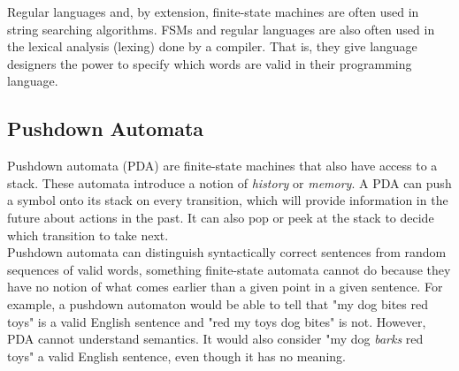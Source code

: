 \vspace{3mm}
\begin{center}
\end{center}
\vspace{5mm}

Regular languages and, by extension, finite-state machines are often used in string searching algorithms. FSMs and regular languages are also often used in the lexical analysis (lexing) done by a compiler. That is, they give language designers the power to specify which words are valid in their programming language. \\

\subsection{Pushdown Automata}

Pushdown automata (PDA) are finite-state machines that also have access to a stack. These automata introduce a notion of \textit{history} or \textit{memory}. A PDA can push a symbol onto its stack on every transition, which will provide information in the future about actions in the past. It can also pop or peek at the stack to decide which transition to take next. \\

Pushdown automata can distinguish syntactically correct sentences from random sequences of valid words, something finite-state automata cannot do because they have no notion of what comes earlier than a given point in a given sentence. For example, a pushdown automaton would be able to tell that "my dog bites red toys" is a valid English sentence and "red my toys dog bites" is not. However, PDA cannot understand semantics. It would also consider "my dog \textit{barks} red toys" a valid English sentence, even though it has no meaning. \\

